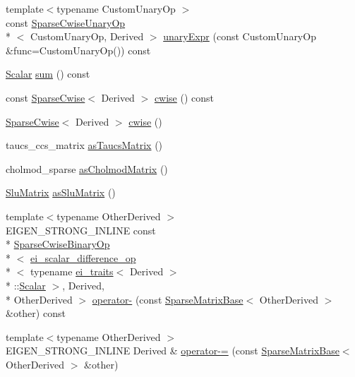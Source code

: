 \begin{DoxyCompactItemize}
\item 
{\footnotesize template$<$typename Custom\-Unary\-Op $>$ }\\const \hyperlink{class_sparse_cwise_unary_op}{Sparse\-Cwise\-Unary\-Op}\\*
$<$ Custom\-Unary\-Op, Derived $>$ \hyperlink{class_sparse_matrix_base_a5bbfb5e4e189e27387a9d8fe5d5cf2aa}{unary\-Expr} (const Custom\-Unary\-Op \&func=Custom\-Unary\-Op()) const 
\item 
\hyperlink{class_sparse_matrix_base_af39d70f2b7e775e9e17b666cd24128c8}{Scalar} \hyperlink{class_sparse_matrix_base_a68206caf3f738693618883f723798f95}{sum} () const 
\item 
const \hyperlink{class_sparse_cwise}{Sparse\-Cwise}$<$ Derived $>$ \hyperlink{class_sparse_matrix_base_acf06a3a48458ca13227ab613e56dc3d2}{cwise} () const 
\item 
\hyperlink{class_sparse_cwise}{Sparse\-Cwise}$<$ Derived $>$ \hyperlink{class_sparse_matrix_base_a9b85f3c7f79d9904d5315503bf32431c}{cwise} ()
\item 
taucs\-\_\-ccs\-\_\-matrix \hyperlink{class_sparse_matrix_base_a8ee99b9f65153acacd8b087afd21b935}{as\-Taucs\-Matrix} ()
\item 
cholmod\-\_\-sparse \hyperlink{class_sparse_matrix_base_a5f7bcb8d960d8e8e6a1cab00e78855ad}{as\-Cholmod\-Matrix} ()
\item 
\hyperlink{struct_slu_matrix}{Slu\-Matrix} \hyperlink{class_sparse_matrix_base_a31db47aa4c051b90922c88f4799c6528}{as\-Slu\-Matrix} ()
\item 
{\footnotesize template$<$typename Other\-Derived $>$ }\\E\-I\-G\-E\-N\-\_\-\-S\-T\-R\-O\-N\-G\-\_\-\-I\-N\-L\-I\-N\-E const \\*
\hyperlink{class_sparse_cwise_binary_op}{Sparse\-Cwise\-Binary\-Op}\\*
$<$ \hyperlink{structei__scalar__difference__op}{ei\-\_\-scalar\-\_\-difference\-\_\-op}\\*
$<$ typename \hyperlink{structei__traits}{ei\-\_\-traits}$<$ Derived $>$\\*
\-::\hyperlink{class_sparse_matrix_base_af39d70f2b7e775e9e17b666cd24128c8}{Scalar} $>$, Derived, \\*
Other\-Derived $>$ \hyperlink{class_sparse_matrix_base_a4c2843da45bf58f49b07ae0519cf36a1}{operator-\/} (const \hyperlink{class_sparse_matrix_base}{Sparse\-Matrix\-Base}$<$ Other\-Derived $>$ \&other) const 
\item 
{\footnotesize template$<$typename Other\-Derived $>$ }\\E\-I\-G\-E\-N\-\_\-\-S\-T\-R\-O\-N\-G\-\_\-\-I\-N\-L\-I\-N\-E Derived \& \hyperlink{class_sparse_matrix_base_a5320af0ac578b2f5526320081b2bb184}{operator-\/=} (const \hyperlink{class_sparse_matrix_base}{Sparse\-Matrix\-Base}$<$ Other\-Derived $>$ \&other)

\end{DoxyCompactItemize}
